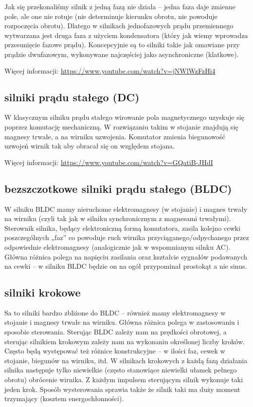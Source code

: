 Jak się przekonaliśmy silnik z jedną fazą nie działa – jedna faza daje zmienne pole, ale one nie rotuje (nie determinuje kierunku obrotu, nie powoduje rozpoczęcia obrotu).
Dlatego w silnikach jednofazowych prądu przemiennego wytwarzana jest druga faza z użyciem kondensatora (który jak wiemy wprowadza przesunięcie fazowe prądu).
Koncepcyjnie są to silniki takie jak omawiane przy prądzie dwufazowym, wykonywane najczęściej jako asynchroniczne (klatkowe).

\noindent Więcej informacji: \url{https://www.youtube.com/watch?v=jNWlWzFzHi4}

\subsection{silniki prądu stałego (DC)}

W klasycznym silniku prądu stałego wirowanie pola magnetycznego uzyskuje się poprzez komutację mechaniczną.
W rozwiązaniu takim w stojanie znajdują się magnesy trwałe, a na wirniku uzwojenia.
Komutator zmienia biegunowość uzwojeń wirnik tak aby obracał się on względem stojana.

\noindent Więcej informacji: \url{https://www.youtube.com/watch?v=GQatiB-JHdI}

\subsection{bezszczotkowe silniki prądu stałego (BLDC)}

W silniku BLDC mamy nieruchome elektromagnesy (w stojanie) i magnes trwały na wirniku (czyli tak jak w silniku synchronicznym z magnesami trwałymi).
Sterownik silnika, będący elektroniczną formą komutatora, zasila kolejno cewki poszczególnych „faz” co powoduje ruch wirnika przyciąganego/odpychanego przez odpowiednie elektromagnesy (analogicznie jak w wspomnianym silnku AC).
Główna różnica polega na napięciu zasilania oraz kształcie sygnałów podawanych na cewki – w silniku BLDC będzie on na ogół przypominał prostokąt a nie sinus.

\subsection{silniki krokowe}

Sa to silniki bardzo zbliżone do BLDC – również mamy elektromagnesy w stojanie i magnesy trwałe na wirniku.
Główna różnica polega w zastosowaniu i sposobie sterowania.
Sterując BLDC zależy nam na prędkości obrotowej, a sterując silnikiem krokowym zależy nam na wykonaniu określonej liczby kroków.
Często będą występować też różnice konstrukcyjne – w ilości faz, cewek w stojanie, biegunów na wirniku, itd.
W silnikach krokowych z każdą fazą działania silnika następuje tylko niewielkie (często stanowiące niewielki ułamek pełnego obrotu) obrócenie wirnika.
Z każdym impulsem sterującym silnik wykonuje taki jeden krok.
Sposób wysterowania sprawia także że silnik taki ma duży moment trzymający (kosztem energochłonności).

